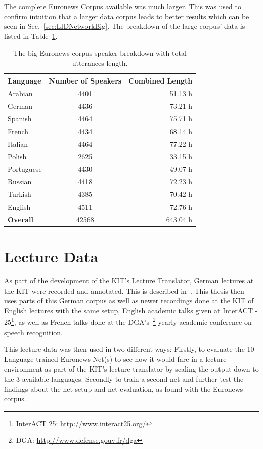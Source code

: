 The complete Euronews Corpus available was much larger. This was used to confirm intuition that a larger data corpus leads to better results which can be seen in Sec.~\ref{sec:LIDNetworkBig}. The breakdown of the large corpus' data is listed in Table~\ref{tab:spkDataBig}.

\begin{table}[h!]
\caption{The big Euronews corpus speaker breakdown with total utterances length.}
\label{tab:spkDataBig}
\centering
\begin{tabular}{| l | c | r | }
	\hline
	\textbf{Language} & \textbf{Number of Speakers} & \textbf{Combined Length} \\
	\hline
	Arabian & 4401 & 51.13 h \\
	German & 4436 & 73.21 h \\
	Spanish & 4464 & 75.71 h \\
	French & 4434 & 68.14 h \\  
	Italian & 4464 & 77.22 h \\  
	Polish & 2625 & 33.15 h \\ 
	Portuguese & 4430 & 49.07 h \\ 
	Russian & 4418 & 72.23 h \\ 
	Turkish & 4385 & 70.42 h \\  
	English & 4511 & 72.76 h \\ 
	\hline
	\textbf{Overall} & 42568 & 643.04 h\\
	\hline	
\end{tabular}
\end{table}

\newpage
\section{Lecture Data}
\label{sec:LITasks:Lecture}

As part of the development of the KIT's Lecture Translator, German lectures at the KIT were recorded and annotated. This is described in~\cite{stuker2012kit}. This thesis then uses parts of this German corpus as well as newer recordings done at the KIT of English lectures with the same setup, English academic talks given at InterACT - 25\footnote{InterACT 25: \url{http://www.interact25.org/}}, as well as French talks done at the DGA's~\footnote{DGA: \url{http://www.defense.gouv.fr/dga}} yearly academic conference on speech recognition.

This lecture data was then used in two different ways: Firstly, to evaluate the 10-Language trained Euronews-Net(s) to see how it would fare in a lecture-environment as part of the KIT's lecture translator by scaling the output down to the 3 available languages. Secondly to train a second net and further test the findings about the net setup and net evaluation, as found with the Euronews corpus.

